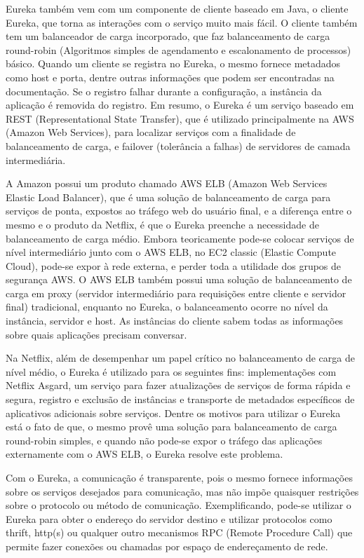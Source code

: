 \documentclass[journal]{IEEEtran}
\begin{document}
Eureka também vem com um componente de cliente baseado em Java, o cliente Eureka, que torna as interações com o serviço muito mais fácil. O cliente também tem um balanceador de carga incorporado, que faz balanceamento de carga round-robin (Algoritmos simples de agendamento e escalonamento de processos) básico. Quando um cliente se registra no Eureka, o mesmo fornece metadados como host e porta, dentre outras informações que podem ser encontradas na documentação. Se o registro falhar durante a configuração, a instância da aplicação é removida do registro. Em resumo, o Eureka é um serviço baseado em REST (Representational State Transfer), que é utilizado principalmente na AWS (Amazon Web Services), para localizar serviços com a finalidade de balanceamento de carga, e failover (tolerância a falhas) de servidores de camada intermediária. 

A Amazon possui um produto chamado AWS ELB (Amazon Web Services Elastic Load Balancer), que é uma solução de balanceamento de carga para serviços de ponta, expostos ao tráfego web do usuário final, e a diferença entre o mesmo e o produto da Netflix, é que o Eureka preenche a necessidade de balanceamento de carga médio. Embora teoricamente pode-se colocar serviços de nível intermediário junto com o AWS ELB, no EC2 classic (Elastic Compute Cloud), pode-se expor à rede externa, e perder toda a utilidade dos grupos de segurança AWS. O AWS ELB  também possui uma solução de balanceamento de carga em proxy (servidor intermediário para requisições entre cliente e servidor final) tradicional, enquanto no Eureka, o balanceamento ocorre no nível da instância, servidor e host. As instâncias do cliente sabem todas as informações sobre quais aplicações precisam conversar.

Na Netflix, além de desempenhar um papel crítico no balanceamento de carga de nível médio, o Eureka é utilizado para os seguintes fins: implementações com Netflix Asgard, um serviço para fazer atualizações de serviços de forma rápida e segura, registro e exclusão de instâncias e transporte de metadados específicos de aplicativos adicionais sobre serviços. Dentre os motivos para utilizar o Eureka está o fato de que, o mesmo provê uma solução para balanceamento de carga round-robin simples, e quando não pode-se expor o tráfego das aplicações externamente com o AWS ELB, o Eureka resolve este problema.

Com o Eureka, a comunicação é transparente, pois o mesmo fornece informações sobre os serviços desejados para comunicação, mas não impõe quaisquer restrições sobre o protocolo ou método de comunicação. Exemplificando, pode-se utilizar o Eureka para obter o endereço do servidor destino e utilizar protocolos como thrift, http(s) ou qualquer outro mecanismos RPC (Remote Procedure Call) que permite fazer conexões ou chamadas por espaço de endereçamento de rede. 
\end{document}
